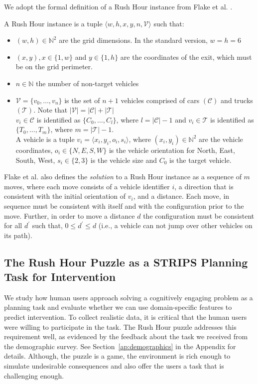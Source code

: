 We adopt the formal definition of a Rush Hour instance from Flake et al. \citeyear{flake2002}. 

\begin{definition} 
\label{def:rush}
A \textnormal{Rush Hour instance} is a tuple $\langle w,h,x,y,n,\mathcal{V}\rangle$ such that:
\begin{itemize}
\item $(w,h) \in {\mathbb{N}}^2$ are the grid dimensions. In the standard version, $w=h=6$
\item $(x,y), x\in\lbrace 1,w\rbrace$ and $y\in\lbrace 1,h\rbrace$ are the coordinates of the exit, which must be on the grid perimeter.
\item $n \in \mathbb{N}$ the number of non-target vehicles
\item $\mathcal{V}=\lbrace v_0, \ldots, v_n \rbrace$ is the set of $n+1$ vehicles comprised of cars $(\mathcal{C})$ and trucks $(\mathcal{T})$. Note that $|\mathcal{V}|=|\mathcal{C}|+|\mathcal{T}|$
\\$v_i \in \mathcal{C}$ is identified as $\lbrace C_0,\ldots,C_l \rbrace$, where $l=|\mathcal{C}|-1$ and $v_i \in \mathcal{T}$ is identified as $\lbrace T_0,\ldots,T_m \rbrace$, where $m=|\mathcal{T}|-1$.
\\A vehicle is a tuple $v_i=\langle x_i,y_i,o_i,s_i \rangle$, where $(x_i,y_i) \in {\mathbb{N}}^2$ are the vehicle coordinates, $o_i \in \lbrace N,E,S,W\rbrace$ is the vehicle orientation for North, East, South, West, $s_i \in \lbrace2,3\rbrace$ is the vehicle size and $C_0$ is the target vehicle.
\end{itemize}
\label{rushdef}
\end{definition}
Flake et al. \citeyear{flake2002} also defines the \textit{solution} to a Rush Hour instance as a sequence of $m$ moves, where each move consists of a vehicle identifier $i$, a direction that is consistent with the initial orientation of $v_i$, and a distance. 
Each move, in sequence must be consistent with itself and with the configuration prior to the move. 
Further, in order to move a distance $d$ the configuration must be consistent for all $d^\prime$ such that, $0\leqslant d^\prime \leqslant d$ (i.e., a vehicle can not jump over other vehicles on its path).


\subsection{The Rush Hour Puzzle as a STRIPS Planning Task for Intervention}
\label{sec:rushhourstrips}
We study how human users approach solving a cognitively engaging problem as a planning task and evaluate whether we can use domain-specific features to predict intervention. 
To collect realistic data, it is critical that the human users were willing to participate in the task. 
The Rush Hour puzzle addresses this requirement well, as evidenced by the feedback about the task we received from the demographic survey. See Section~\ref{ap:demographics} in the Appendix for details.
Although, the puzzle is a game, the environment is rich enough to simulate undesirable consequences and also offer the users a task that is challenging enough.

